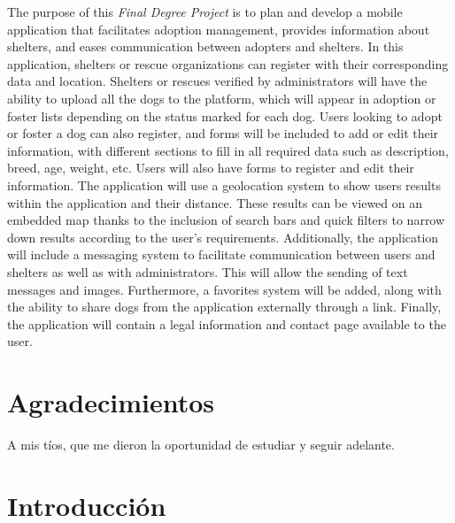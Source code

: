 \documentclass[a4paper, 12pt]{article}
\begin{document}
The purpose of this \textit{Final Degree Project} is to plan and develop a mobile application that facilitates adoption management, provides information about shelters, and eases communication between adopters and shelters. In this application, shelters or rescue organizations can register with their corresponding data and location. Shelters or rescues verified by administrators will have the ability to upload all the dogs to the platform, which will appear in adoption or foster lists depending on the status marked for each dog. Users looking to adopt or foster a dog can also register, and forms will be included to add or edit their information, with different sections to fill in all required data such as description, breed, age, weight, etc. Users will also have forms to register and edit their information. The application will use a geolocation system to show users results within the application and their distance. These results can be viewed on an embedded map thanks to the inclusion of search bars and quick filters to narrow down results according to the user's requirements. Additionally, the application will include a messaging system to facilitate communication between users and shelters as well as with administrators. This will allow the sending of text messages and images. Furthermore, a favorites system will be added, along with the ability to share dogs from the application externally through a link. Finally, the application will contain a legal information and contact page available to the user.

\newpage
\thispagestyle{empty}
\mbox{}

\newpage
\section*{Agradecimientos}
\begin{center} 
\vspace*{\fill}
A mis tíos, que me dieron la oportunidad de estudiar y seguir adelante.
\vspace*{\fill}
\end{center} 

\newpage
\thispagestyle{empty}
\mbox{}
\newpage
\thispagestyle{empty}
\mbox{}

\tableofcontents
\listoftables
\listoffigures

\newpage
\thispagestyle{empty}
\mbox{}

\newpage
\section{Introducción}
\end{document}
